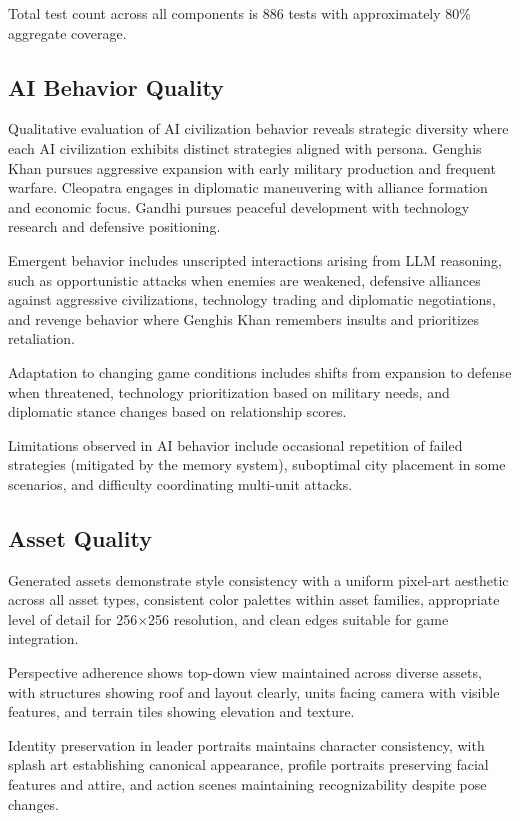 \documentclass[conference]{IEEEtran}
\begin{document}
Total test count across all components is 886 tests with approximately 80\% aggregate coverage.

\subsection{AI Behavior Quality}

Qualitative evaluation of AI civilization behavior reveals strategic diversity where each AI civilization exhibits distinct strategies aligned with persona. Genghis Khan pursues aggressive expansion with early military production and frequent warfare. Cleopatra engages in diplomatic maneuvering with alliance formation and economic focus. Gandhi pursues peaceful development with technology research and defensive positioning.

Emergent behavior includes unscripted interactions arising from LLM reasoning, such as opportunistic attacks when enemies are weakened, defensive alliances against aggressive civilizations, technology trading and diplomatic negotiations, and revenge behavior where Genghis Khan remembers insults and prioritizes retaliation.

Adaptation to changing game conditions includes shifts from expansion to defense when threatened, technology prioritization based on military needs, and diplomatic stance changes based on relationship scores.

Limitations observed in AI behavior include occasional repetition of failed strategies (mitigated by the memory system), suboptimal city placement in some scenarios, and difficulty coordinating multi-unit attacks.

\subsection{Asset Quality}

Generated assets demonstrate style consistency with a uniform pixel-art aesthetic across all asset types, consistent color palettes within asset families, appropriate level of detail for 256$\times$256 resolution, and clean edges suitable for game integration.

Perspective adherence shows top-down view maintained across diverse assets, with structures showing roof and layout clearly, units facing camera with visible features, and terrain tiles showing elevation and texture.

Identity preservation in leader portraits maintains character consistency, with splash art establishing canonical appearance, profile portraits preserving facial features and attire, and action scenes maintaining recognizability despite pose changes.
\end{document}
